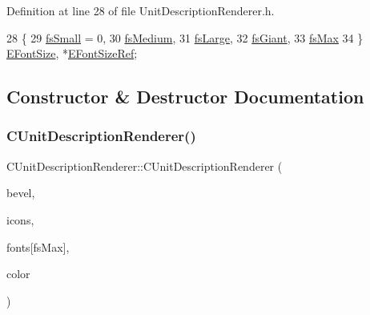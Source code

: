 Definition at line 28 of file Unit\+Description\+Renderer.\+h.


\begin{DoxyCode}
28                     \{
29             \hyperlink{classCUnitDescriptionRenderer_a3ea4cd83b6dd9533ab3abb953a7da35aaa0ab2dd25d9db891e7a7158795b46c63}{fsSmall} = 0,
30             \hyperlink{classCUnitDescriptionRenderer_a3ea4cd83b6dd9533ab3abb953a7da35aa7b5aa12d8a01b317ebfbf1bd65d7e568}{fsMedium},
31             \hyperlink{classCUnitDescriptionRenderer_a3ea4cd83b6dd9533ab3abb953a7da35aaf467097fe4f4811a5e2f1959c86e071d}{fsLarge},
32             \hyperlink{classCUnitDescriptionRenderer_a3ea4cd83b6dd9533ab3abb953a7da35aa6194fc38e2cf8a4f891a90cbed5eafdd}{fsGiant},
33             \hyperlink{classCUnitDescriptionRenderer_a3ea4cd83b6dd9533ab3abb953a7da35aa74218e4708bac1eab359099eb0b159b2}{fsMax}
34         \} \hyperlink{classCUnitDescriptionRenderer_a3ea4cd83b6dd9533ab3abb953a7da35a}{EFontSize}, *\hyperlink{classCUnitDescriptionRenderer_a80d47a4b8bb5558bff5db296b614dd75}{EFontSizeRef};
\end{DoxyCode}


\subsection{Constructor \& Destructor Documentation}
\hypertarget{classCUnitDescriptionRenderer_aaabf682ccd3f6b4075763657e7af33d8}{}\label{classCUnitDescriptionRenderer_aaabf682ccd3f6b4075763657e7af33d8} 
\subsubsection{\texorpdfstring{C\+Unit\+Description\+Renderer()}{CUnitDescriptionRenderer()}}
{\footnotesize\ttfamily C\+Unit\+Description\+Renderer\+::\+C\+Unit\+Description\+Renderer (\begin{DoxyParamCaption}\item[{std\+::shared\+\_\+ptr$<$ \hyperlink{classCBevel}{C\+Bevel} $>$}]{bevel,  }\item[{std\+::shared\+\_\+ptr$<$ \hyperlink{classCGraphicMulticolorTileset}{C\+Graphic\+Multicolor\+Tileset} $>$}]{icons,  }\item[{std\+::shared\+\_\+ptr$<$ \hyperlink{classCFontTileset}{C\+Font\+Tileset} $>$}]{fonts\mbox{[}fs\+Max\mbox{]},  }\item[{\hyperlink{GameDataTypes_8h_aafb0ca75933357ff28a6d7efbdd7602f}{E\+Player\+Color}}]{color }\end{DoxyParamCaption})}



